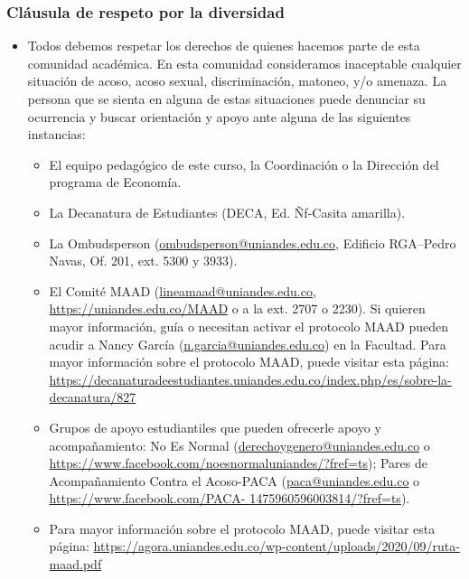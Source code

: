 \documentclass[
  shownotes,
  xcolor={svgnames},
  hyperref={colorlinks,citecolor=DarkBlue,linkcolor=DarkRed,urlcolor=DarkBlue}
  , aspectratio=169]{beamer}
\begin{document}
\begin{frame}
\frametitle{Cláusula de respeto por la diversidad}

\begin{itemize}
  \footnotesize
\item  Todos debemos respetar los derechos de quienes hacemos parte de esta comunidad académica. En esta comunidad consideramos inaceptable cualquier situación de acoso, acoso sexual, discriminación, matoneo, y/o amenaza.
La persona que se sienta en alguna de estas situaciones puede denunciar su ocurrencia y buscar orientación y apoyo ante alguna de las siguientes instancias:
\begin{itemize}
  \scriptsize
\item El equipo pedagógico de este curso, la Coordinación o la Dirección del programa de Economía. 
\item La Decanatura de Estudiantes (DECA, Ed. Ñf-Casita amarilla).
\item La Ombudsperson (\href{mailto:ombudsperson@uniandes.edu.co}{ombudsperson@uniandes.edu.co}, Edificio RGA–Pedro Navas, Of. 201, ext. 5300 y 3933).
\item El Comité MAAD (\href{mailto:lineamaad@uniandes.edu.co}{lineamaad@uniandes.edu.co}, \url{https://uniandes.edu.co/MAAD} o a la ext. 2707 o 2230). Si quieren mayor información, guía o necesitan activar el protocolo MAAD pueden acudir a Nancy García (\href{mailto:n.garcia@uniandes.edu.co}{n.garcia@uniandes.edu.co}) en la Facultad. Para mayor información sobre el protocolo MAAD, puede visitar esta página: \url{https://decanaturadeestudiantes.uniandes.edu.co/index.php/es/sobre-la-decanatura/827}
\item Grupos de apoyo estudiantiles que pueden ofrecerle apoyo y acompañamiento: No Es Normal (\href{mailto:derechoygenero@uniandes.edu.co}{derechoygenero@uniandes.edu.co} o \url{https://www.facebook.com/noesnormaluniandes/?fref=ts}); Pares de Acompañamiento Contra el Acoso-PACA (\href{mailto:paca@uniandes.edu.co}{paca@uniandes.edu.co} o \url{https://www.facebook.com/PACA- 1475960596003814/?fref=ts}).
\item Para mayor información sobre el protocolo MAAD, puede visitar esta página: \url{https://agora.uniandes.edu.co/wp-content/uploads/2020/09/ruta-maad.pdf}


\end{itemize}
\end{itemize}
\end{frame}
\end{document}
